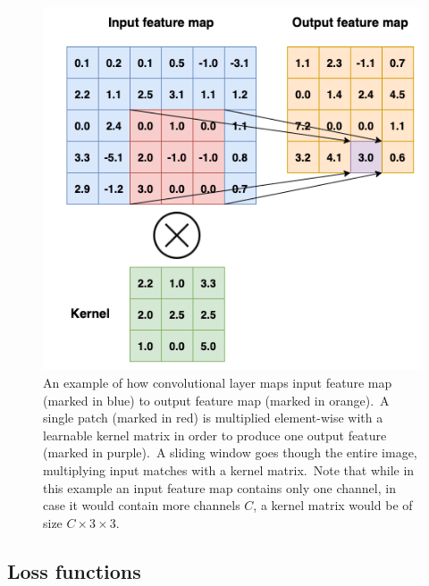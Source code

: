 \documentclass[longabstract, english, mgr]{iithesis}
\theoremstyle{default_theorem_style}\newtheorem{theorem}{Theorem}
\theoremstyle{default_theorem_style}\newtheorem{definition}{Definition}
\begin{document}
\begin{figure}[t]
\centering
\includegraphics[scale=0.48]{convolutional_network}
\caption{An example of how convolutional layer maps input feature map (marked in blue) to output feature
map (marked in orange).\ A single patch (marked in red) is multiplied element-wise with a learnable kernel matrix in
order to produce one output feature (marked in purple).\ A sliding window goes though the entire image, multiplying
input matches with a kernel matrix.\ Note that while in this example an input feature map contains only one channel,
in case it would contain more channels $C$, a kernel matrix would be of size $C \times 3 \times 3$.}
\label{fig:convolutional_network}
\end{figure}

\subsection{Loss functions}
\end{document}

